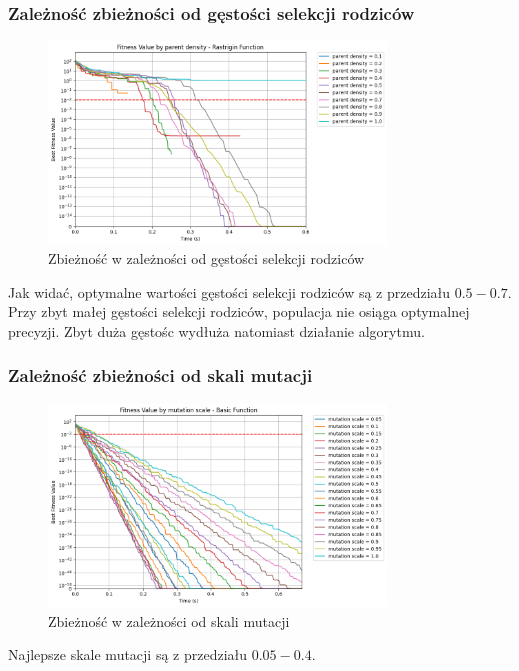 \documentclass{article}
\begin{document}
\subsubsection*{Zależność zbieżności od gęstości selekcji rodziców}
\begin{figure}[H]
    \centering
    \includegraphics[width=0.8\textwidth]{img/ae1/parent_density.png}
    \caption{Zbieżność w zależności od gęstości selekcji rodziców}
\end{figure}
Jak widać, optymalne wartości gęstości selekcji rodziców są z przedziału $0.5 - 0.7$. Przy zbyt małej gęstości selekcji rodziców, populacja nie osiąga optymalnej precyzji. Zbyt duża gęstośc wydłuża natomiast działanie algorytmu.

\subsubsection*{Zależność zbieżności od skali mutacji}
\begin{figure}[H]
    \centering
    \includegraphics[width=0.8\textwidth]{img/ae1/mutation_scale.png}
    \caption{Zbieżność w zależności od skali mutacji}
\end{figure}
Najlepsze skale mutacji są z przedziału $0.05 - 0.4$.
\end{document}
